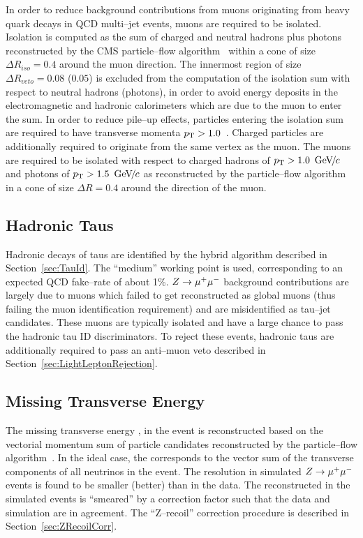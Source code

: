 In order to reduce background contributions from muons originating from heavy
quark decays in QCD multi--jet events, muons are required to be isolated.
Isolation is computed as the \pt sum of charged and neutral hadrons plus photons
reconstructed by the CMS particle--flow algorithm~\cite{CMS-PAS-PFT-09-001} within a
cone of size $\Delta R_{iso} = 0.4$ around the muon direction.  The innermost
region of size $\Delta R_{veto} = 0.08$ ($0.05$) is excluded from the
computation of the isolation \pt sum with respect to neutral hadrons (photons),
in order to avoid energy deposits in the electromagnetic and hadronic
calorimeters which are due to the muon to enter the sum.  In order to reduce
pile--up effects, particles entering the isolation \pt sum are required to have
transverse momenta $p_{\mathrm{T}} > 1.0$~\GeVc.  Charged particles are additionally
required to originate from the same vertex as the muon.  The muons are required
to be isolated with respect to charged hadrons of $p_{\mathrm{T}} > 1.0~{\,\text{Ge\hspace{-.08em}V\hspace{-0.16em}/\hspace{-0.08em}}c}$ and photons
of $p_{\mathrm{T}} > 1.5~{\,\text{Ge\hspace{-.08em}V\hspace{-0.16em}/\hspace{-0.08em}}c}$ as reconstructed by the particle--flow
algorithm~\cite{CMS-PAS-PFT-09-001} in a cone of size $\Delta R = 0.4$ around
the direction of the muon.

\subsection{Hadronic Taus}

Hadronic decays of taus are identified by the \hpsTanc hybrid algorithm
described in Section~\ref{sec:TauId}.  The ``medium'' working point is used,
corresponding to an expected QCD fake--rate of about 1\%. $Z \to \mu^+\mu^-$ background
contributions are largely due to muons which failed to get reconstructed as
global muons (thus failing the muon identification requirement) and are
misidentified as tau--jet candidates.  These muons are typically isolated and
have a large chance to pass the hadronic tau ID discriminators.  To reject these
events, hadronic taus are additionally required to pass an anti--muon veto
described in Section~\ref{sec:LightLeptonRejection}. 

\subsection{Missing Transverse Energy}

The missing transverse energy \MET, in the event is reconstructed based on the
vectorial momentum sum of particle candidates reconstructed by the
particle--flow algorithm~\cite{CMS-PAS-PFT-09-001, CMS-PAS-JME-10-005}.  In the
ideal case, the \MET corresponds to the vector sum of the transverse components
of all neutrinos in the event.  The \MET resolution in simulated $Z\to\mu^+\mu^-$
events is found to be smaller (better) than in the data.   The reconstructed
\MET in the simulated events is ``smeared'' by a correction factor such that the
data and simulation are in agreement.  The ``Z--recoil'' \MET correction
procedure is described in Section~\ref{sec:ZRecoilCorr}.

